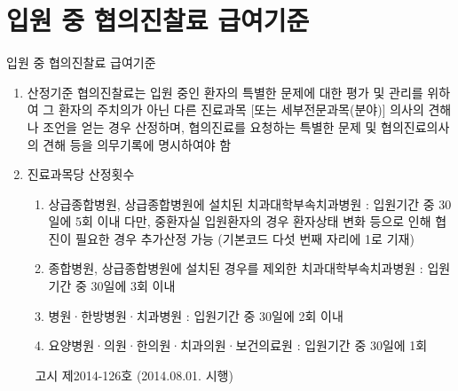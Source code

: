 ﻿\section{입원 중 협의진찰료 급여기준}

\begin{commentbox}{입원 중 협의진찰료 급여기준}
\begin{enumerate}[1.]\tightlist
\item 산정기준
협의진찰료는 입원 중인 환자의 특별한 문제에 대한 평가 및 관리를 위하여 그 환자의 주치의가 아닌 다른 진료과목 [또는 세부전문과목(분야)] 의사의 견해나 조언을 얻는 경우 산정하며, 협의진료를 요청하는 특별한 문제 및 협의진료의사의 견해 등을 의무기록에 명시하여야 함
\item 진료과목당 산정횟수
	\begin{enumerate}[가.]\tightlist
	\item 상급종합병원, 상급종합병원에 설치된 치과대학부속치과병원 : 입원기간 중 30일에 5회 이내
다만, 중환자실 입원환자의 경우 환자상태 변화 등으로 인해 협진이 필요한 경우 추가산정 가능 (기본코드 다섯 번째 자리에 1로 기재)
	\item 종합병원, 상급종합병원에 설치된 경우를 제외한 치과대학부속치과병원
: 입원기간 중 30일에 3회 이내
	\item 병원·한방병원·치과병원
: 입원기간 중 30일에 2회 이내
	\item 요양병원·의원·한의원·치과의원·보건의료원
: 입원기간 중 30일에 1회
	\end{enumerate}
 고시 제2014-126호 (2014.08.01. 시행)
\end{enumerate}
\end{commentbox}


